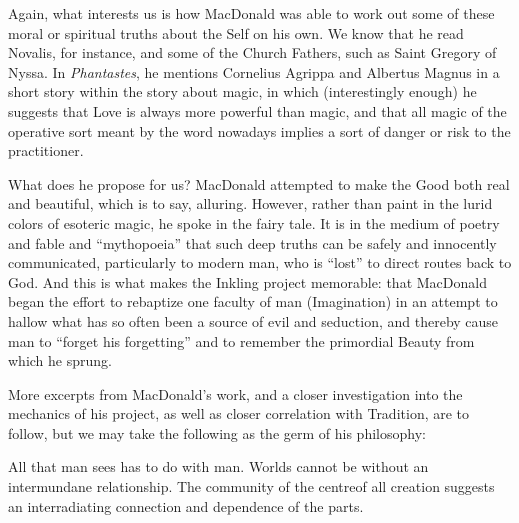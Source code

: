 Again, what interests us is how MacDonald was able to work out some of these moral or spiritual truths about the Self on his own. We know that he read Novalis, for instance, and some of the Church Fathers, such as Saint Gregory of Nyssa. In \emph{Phantastes}, he mentions Cornelius Agrippa and Albertus Magnus in a short story within the story about magic, in which (interestingly enough) he suggests that Love is always more powerful than magic, and that all magic of the operative sort meant by the word nowadays implies a sort of danger or risk to the practitioner.

What does he propose for us? MacDonald attempted to make the Good both real and beautiful, which is to say, alluring. However, rather than paint in the lurid colors of esoteric magic, he spoke in the fairy tale. It is in the medium of poetry and fable and ``mythopoeia'' that such deep truths can be safely and innocently communicated, particularly to modern man, who is ``lost'' to direct routes back to God. And this is what makes the Inkling project memorable: that MacDonald began the effort to rebaptize one faculty of man (Imagination) in an attempt to hallow what has so often been a source of evil and seduction, and thereby cause man to ``forget his forgetting'' and to remember the primordial Beauty from which he sprung.

More excerpts from MacDonald's work, and a closer investigation into the mechanics of his project, as well as closer correlation with Tradition, are to follow, but we may take the following as the germ of his philosophy:

\begin{quotex}
All that man sees has to do with man. Worlds cannot be without an intermundane relationship. The community of the centreof all creation suggests an interradiating connection and dependence of the parts.
\end{quotex}


